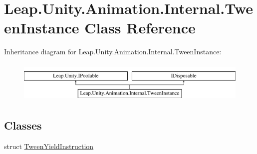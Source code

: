 \hypertarget{class_leap_1_1_unity_1_1_animation_1_1_internal_1_1_tween_instance}{}\section{Leap.\+Unity.\+Animation.\+Internal.\+Tween\+Instance Class Reference}
\label{class_leap_1_1_unity_1_1_animation_1_1_internal_1_1_tween_instance}
Inheritance diagram for Leap.\+Unity.\+Animation.\+Internal.\+Tween\+Instance\+:\begin{figure}[H]
\begin{center}
\leavevmode
\includegraphics[height=2.000000cm]{class_leap_1_1_unity_1_1_animation_1_1_internal_1_1_tween_instance}
\end{center}
\end{figure}
\subsection*{Classes}
\begin{DoxyCompactItemize}
\item 
struct \mbox{\hyperlink{struct_leap_1_1_unity_1_1_animation_1_1_internal_1_1_tween_instance_1_1_tween_yield_instruction}{Tween\+Yield\+Instruction}}
\end{DoxyCompactItemize}
